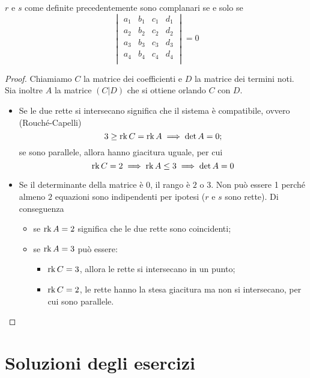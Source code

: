 \documentclass{article}     %
\begin{document}
\begin{prop}
    $r$ e $s$ come definite precedentemente sono complanari se e solo se 
    \[\begin{vmatrix}
        a_1&b_1&c_1&d_1\\
        a_2&b_2&c_2&d_2\\
        a_3&b_3&c_3&d_3\\
        a_4&b_4&c_4&d_4\\
    \end{vmatrix}=0\]
\end{prop}
\begin{proof}
    Chiamiamo $C$ la matrice dei coefficienti e $D$ la matrice dei termini noti. Sia inoltre $A$ la matrice $(C|D)$ che si ottiene orlando $C$ con $D$.
    \begin{itemize}
        \item[\say{$\Rarr$}] Se le due rette si intersecano significa che il sistema è compatibile, ovvero (Rouché-Capelli) \[3\geq \operatorname{rk} C=\operatorname{rk} A\implies \det A=0;\]
        se sono parallele, allora hanno giacitura uguale, per cui 
        \[\operatorname{rk} C=2\implies \operatorname{rk} A\leq 3\implies \det A=0\]
        \item[\say{$\Larr$}] Se il determinante della matrice è $0$, il rango è $2$ o $3$. Non può essere 1 perché almeno $2$ equazioni sono indipendenti per ipotesi ($r$ e $s$ sono rette). Di conseguenza
        \begin{itemize}
            \item se $\operatorname{rk} A=2$ significa che le due rette sono coincidenti;
            \item se $\operatorname{rk} A=3$ può essere:
            \begin{itemize}
                \item $\operatorname{rk} C=3$, allora le rette si intersecano in un punto;
                \item $\operatorname{rk} C=2$, le rette hanno la stesa giacitura ma non si intersecano, per cui sono parallele.
            \end{itemize}
        \end{itemize}
    \end{itemize}
\end{proof}
\newpage
\section{Soluzioni degli esercizi}
\end{document}
